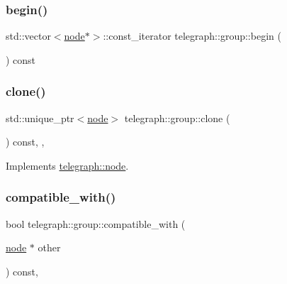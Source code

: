 \mbox{\label{classtelegraph_1_1group_a0ec680f2044108436dbecc8f25b2cba6}} 
\subsubsection{\texorpdfstring{begin()}{begin()}\hspace{0.1cm}{\footnotesize\ttfamily [2/2]}}
{\footnotesize\ttfamily std\+::vector$<$\hyperlink{classtelegraph_1_1node}{node}$\ast$$>$\+::const\+\_\+iterator telegraph\+::group\+::begin (\begin{DoxyParamCaption}{ }\end{DoxyParamCaption}) const\hspace{0.3cm}{\ttfamily [inline]}}

\mbox{\label{classtelegraph_1_1group_a0e937eea18e4f650b892ac9061c461fa}} 
\subsubsection{\texorpdfstring{clone()}{clone()}}
{\footnotesize\ttfamily std\+::unique\+\_\+ptr$<$\hyperlink{classtelegraph_1_1node}{node}$>$ telegraph\+::group\+::clone (\begin{DoxyParamCaption}{ }\end{DoxyParamCaption}) const\hspace{0.3cm}{\ttfamily [inline]}, {\ttfamily [override]}, {\ttfamily [virtual]}}



Implements \hyperlink{classtelegraph_1_1node_ae90515f4573cfa43c168cba9d542df6b}{telegraph\+::node}.

\mbox{\label{classtelegraph_1_1group_a63cf8362b39b718e9553a519485f7875}} 
\subsubsection{\texorpdfstring{compatible\+\_\+with()}{compatible\_with()}}
{\footnotesize\ttfamily bool telegraph\+::group\+::compatible\+\_\+with (\begin{DoxyParamCaption}\item[{\hyperlink{classtelegraph_1_1node}{node} $\ast$}]{other }\end{DoxyParamCaption}) const\hspace{0.3cm}{\ttfamily [override]}, {\ttfamily [virtual]}}



